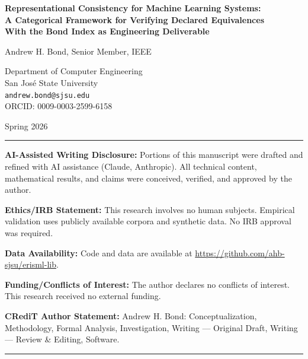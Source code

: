 \documentclass[12pt,letterpaper]{article}
\begin{document}
\begin{titlepage}
\centering
\vspace*{2cm}

{\LARGE\bfseries Representational Consistency for Machine Learning Systems:\\
A Categorical Framework for Verifying Declared Equivalences\\
With the Bond Index as Engineering Deliverable\par}

\vspace{2cm}

{\large Andrew H. Bond, Senior Member, IEEE\par}
\vspace{0.5cm}
{\normalsize Department of Computer Engineering\\
San Jos\'{e} State University\\
\texttt{andrew.bond@sjsu.edu}\\
ORCID: 0009-0003-2599-6158\par}

\vspace{1cm}

{\normalsize Spring 2026\par}

\vfill

\noindent\rule{\textwidth}{0.4pt}
\small

\noindent\textbf{AI-Assisted Writing Disclosure:} Portions of this manuscript were drafted and refined with AI assistance (Claude, Anthropic). All technical content, mathematical results, and claims were conceived, verified, and approved by the author.

\vspace{0.5em}
\noindent\textbf{Ethics/IRB Statement:} This research involves no human subjects. Empirical validation uses publicly available corpora and synthetic data. No IRB approval was required.

\vspace{0.5em}
\noindent\textbf{Data Availability:} Code and data are available at \url{https://github.com/ahb-sjsu/erisml-lib}.

\vspace{0.5em}
\noindent\textbf{Funding/Conflicts of Interest:} The author declares no conflicts of interest. This research received no external funding.

\vspace{0.5em}
\noindent\textbf{CRediT Author Statement:} Andrew H. Bond: Conceptualization, Methodology, Formal Analysis, Investigation, Writing --- Original Draft, Writing --- Review \& Editing, Software.

\normalsize
\noindent\rule{\textwidth}{0.4pt}

\end{titlepage}
\end{document}
